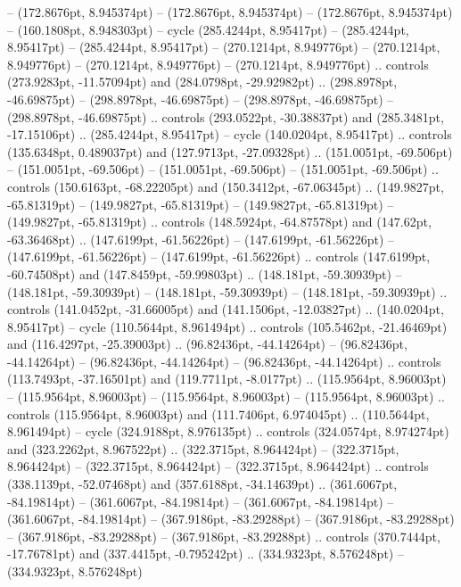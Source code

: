  -- (172.8676pt, 8.945374pt)
 -- (172.8676pt, 8.945374pt)
 -- (172.8676pt, 8.945374pt)
 -- (160.1808pt, 8.948303pt) -- cycle
(285.4244pt, 8.95417pt) -- (285.4244pt, 8.95417pt)
 -- (285.4244pt, 8.95417pt)
 -- (270.1214pt, 8.949776pt)
 -- (270.1214pt, 8.949776pt)
 -- (270.1214pt, 8.949776pt)
 -- (270.1214pt, 8.949776pt) .. controls (273.9283pt, -11.57094pt) and (284.0798pt, -29.92982pt) .. (298.8978pt, -46.69875pt)
 -- (298.8978pt, -46.69875pt)
 -- (298.8978pt, -46.69875pt)
 -- (298.8978pt, -46.69875pt) .. controls (293.0522pt, -30.38837pt) and (285.3481pt, -17.15106pt) .. (285.4244pt, 8.95417pt) -- cycle
(140.0204pt, 8.95417pt) .. controls (135.6348pt, 0.489037pt) and (127.9713pt, -27.09328pt) .. (151.0051pt, -69.506pt)
 -- (151.0051pt, -69.506pt)
 -- (151.0051pt, -69.506pt)
 -- (151.0051pt, -69.506pt) .. controls (150.6163pt, -68.22205pt) and (150.3412pt, -67.06345pt) .. (149.9827pt, -65.81319pt)
 -- (149.9827pt, -65.81319pt)
 -- (149.9827pt, -65.81319pt)
 -- (149.9827pt, -65.81319pt) .. controls (148.5924pt, -64.87578pt) and (147.62pt, -63.36468pt) .. (147.6199pt, -61.56226pt)
 -- (147.6199pt, -61.56226pt)
 -- (147.6199pt, -61.56226pt)
 -- (147.6199pt, -61.56226pt) .. controls (147.6199pt, -60.74508pt) and (147.8459pt, -59.99803pt) .. (148.181pt, -59.30939pt)
 -- (148.181pt, -59.30939pt)
 -- (148.181pt, -59.30939pt)
 -- (148.181pt, -59.30939pt) .. controls (141.0452pt, -31.66005pt) and (141.1506pt, -12.03827pt) .. (140.0204pt, 8.95417pt) -- cycle
(110.5644pt, 8.961494pt) .. controls (105.5462pt, -21.46469pt) and (116.4297pt, -25.39003pt) .. (96.82436pt, -44.14264pt)
 -- (96.82436pt, -44.14264pt)
 -- (96.82436pt, -44.14264pt)
 -- (96.82436pt, -44.14264pt) .. controls (113.7493pt, -37.16501pt) and (119.7711pt, -8.0177pt) .. (115.9564pt, 8.96003pt)
 -- (115.9564pt, 8.96003pt)
 -- (115.9564pt, 8.96003pt)
 -- (115.9564pt, 8.96003pt) .. controls (115.9564pt, 8.96003pt) and (111.7406pt, 6.974045pt) .. (110.5644pt, 8.961494pt) -- cycle
(324.9188pt, 8.976135pt) .. controls (324.0574pt, 8.974274pt) and (323.2262pt, 8.967522pt) .. (322.3715pt, 8.964424pt)
 -- (322.3715pt, 8.964424pt)
 -- (322.3715pt, 8.964424pt)
 -- (322.3715pt, 8.964424pt) .. controls (338.1139pt, -52.07468pt) and (357.6188pt, -34.14639pt) .. (361.6067pt, -84.19814pt)
 -- (361.6067pt, -84.19814pt)
 -- (361.6067pt, -84.19814pt)
 -- (361.6067pt, -84.19814pt)
 -- (367.9186pt, -83.29288pt)
 -- (367.9186pt, -83.29288pt)
 -- (367.9186pt, -83.29288pt)
 -- (367.9186pt, -83.29288pt) .. controls (370.7444pt, -17.76781pt) and (337.4415pt, -0.795242pt) .. (334.9323pt, 8.576248pt)
 -- (334.9323pt, 8.576248pt)
